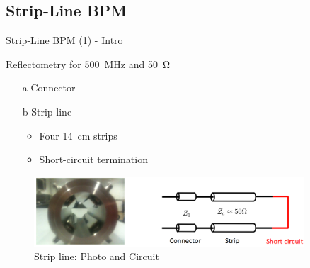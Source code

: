 \documentclass{beamer}
\begin{document}
\subsection{Strip-Line BPM}
\begin{frame}[t,fragile]{Strip-Line BPM (1) - Intro}

Reflectometry for \SI{500}{\MHz} and \SI{50}{\ohm}
\begin{itemize}
\item[a] Connector
\item[b] Strip line
\begin{itemize}
\item Four \SI{14}{\cm} strips
\item Short-circuit termination
\end{itemize}
\end{itemize}

\begin{figure}
  \centering
  \includegraphics[width=0.9\textwidth]{2_1}
  \caption{Strip line: Photo and Circuit}
\end{figure}

\end{frame}
\end{document}
